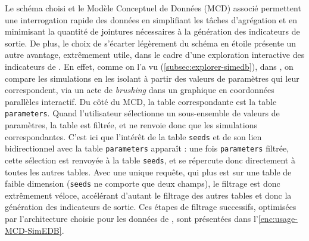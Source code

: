 Le schéma choisi et le Modèle Conceptuel de Données (MCD) associé permettent une interrogation rapide des données en simplifiant les tâches d'agrégation et en minimisant la quantité de jointures nécessaires à la génération des indicateurs de sortie.
De plus, le choix de s'écarter légèrement du schéma en étoile présente un autre avantage, extrêmement utile, dans le cadre d'une exploration interactive des indicateurs de \simfeodal{}.
En effet, comme on l'a vu (\cref{subsec:explorer-simedb}), dans \simedb{}, on compare les simulations en les isolant à partir des valeurs de paramètres qui leur correspondent, via un acte de \textit{brushing} dans un graphique en coordonnées parallèles interactif.
Du côté du MCD, la table correspondante est la table \texttt{parameters}.
Quand l'utilisateur sélectionne un sous-ensemble de valeurs de paramètres, la table est filtrée, et ne renvoie donc que les simulations correspondantes.
C'est ici que l'intérêt de la table \texttt{seeds} et de son lien bidirectionnel avec la table \texttt{parameters} apparaît : une fois \texttt{parameters} filtrée, cette sélection est renvoyée à la table \texttt{seeds}, et se répercute donc directement à toutes les autres tables.
Avec une unique requête, qui plus est sur une table de faible dimension (\texttt{seeds} ne comporte que deux champs), le filtrage est donc extrêmement véloce, accélérant d'autant le filtrage des autres tables et donc la génération des indicateurs de sortie.
Ces étapes de filtrage successifs, optimisées par l'architecture choisie pour les données de \simfeodal{}, sont présentées dans l'\cref{enc:usage-MCD-SimEDB}.

